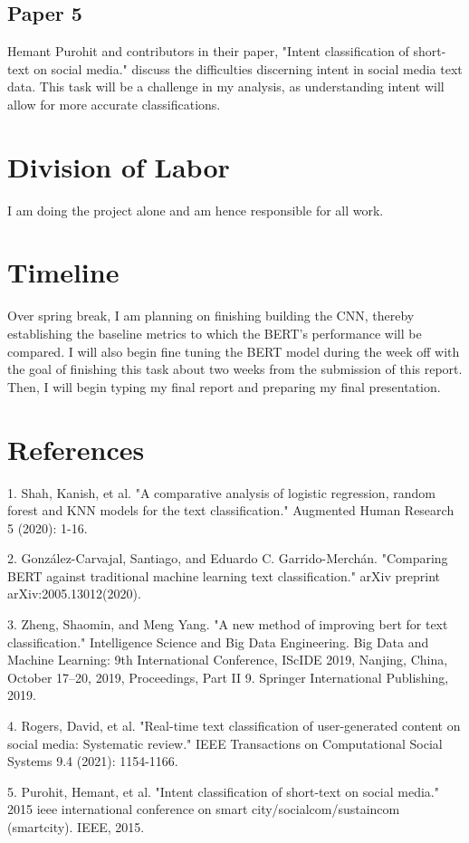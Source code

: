 \documentclass[11pt,a4paper]{article}
\begin{document}
\subsection{Paper 5}

Hemant Purohit and contributors in their paper, "Intent classification of short-text on social media." discuss the difficulties discerning intent in social media text data. This task will be a challenge in my analysis, as understanding intent will allow for more accurate classifications.

\section{Division of Labor}

I am doing the project alone and am hence responsible for all work.

\section{Timeline}

Over spring break, I am planning on finishing building the CNN, thereby establishing the baseline metrics to which the BERT’s performance will be compared. I will also begin fine tuning the BERT model during the week off with the goal of finishing this task about two weeks from the submission of this report. Then, I will begin typing my final report and preparing my final presentation.

\section{References}



1. Shah, Kanish, et al. "A comparative analysis of logistic regression, random forest and KNN models for the text classification." Augmented Human Research 5 (2020): 1-16. 


2. González-Carvajal, Santiago, and Eduardo C. Garrido-Merchán. "Comparing BERT against traditional machine learning text classification." arXiv preprint arXiv:2005.13012(2020). 


3. Zheng, Shaomin, and Meng Yang. "A new method of improving bert for text classification." Intelligence Science and Big Data Engineering. Big Data and Machine Learning: 9th International Conference, IScIDE 2019, Nanjing, China, October 17–20, 2019, Proceedings, Part II 9. Springer International Publishing, 2019. 


4. Rogers, David, et al. "Real-time text classification of user-generated content on social media: Systematic review." IEEE Transactions on Computational Social Systems 9.4 (2021): 1154-1166. 


5. Purohit, Hemant, et al. "Intent classification of short-text on social media." 2015 ieee international conference on smart city/socialcom/sustaincom (smartcity). IEEE, 2015. 
\end{document}
